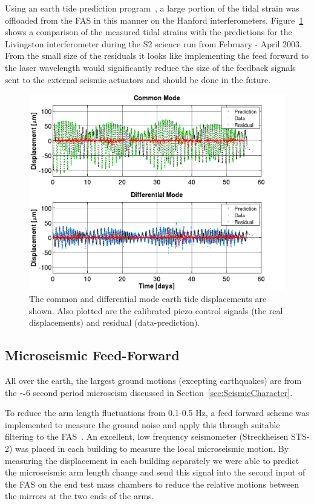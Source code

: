 Using an earth tide prediction program~\cite{Fred:Tides}, 
a large portion of the tidal strain was offloaded from the 
FAS in this manner on the Hanford interferometers. Figure~\ref{fig:TidalPred}
shows a comparison of the measured tidal strains with the predictions for the
Livingston interferometer during the S2 science run from February - April 2003.
From the small size of the residuals it looks like implementing the feed
forward to the laser wavelength would significantly reduce the size of the
feedback signals sent to the external seismic actuators and should be done
in the future.


\begin{figure}[!h]
\centerline{
\includegraphics[angle=0,width=6.5in]{Figures/Chap5/Tides.png}}
\caption[Tidal Prediction]{The common and differential mode earth tide displacements
         are shown. Also plotted are the calibrated piezo control signals (the real
         displacements) and residual (data-prediction).}
\label{fig:TidalPred}
\end{figure}


\subsection{Microseismic Feed-Forward}

All over the earth, the largest ground motions (excepting earthquakes) are from the
$\sim$6 second period microseism discussed in Section~\ref{sec:SeismicCharacter}.

To reduce the arm length fluctuations from 0.1-0.5 Hz, a feed forward
scheme was implemented to measure the ground noise and apply this through
suitable filtering to the FAS~\cite{Giaime:MSFF}. An excellent, low frequency
seismometer (Streckheisen STS-2) was placed in each building to measure the
local microseismic motion. By measuring the displacement in each building
separately we were able to predict the microseismic arm length change and
send this signal into the second input of the FAS on the end test mass chambers 
to reduce the relative motions between the mirrors at the two ends of the arms.

